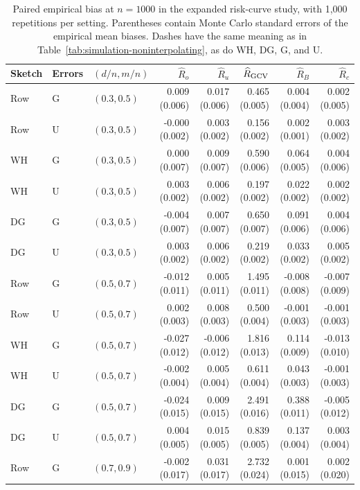 \documentclass{article}
\theoremstyle{plain}
\theoremstyle{definition}
\theoremstyle{definition}
\begin{document}
\begin{table}[!htbp]
    \centering
    \footnotesize
    \setlength{\tabcolsep}{2.5pt}
    \caption{Paired empirical bias at $n=1000$ in the expanded
    risk-curve study, with 1,000 repetitions per setting. Parentheses
    contain Monte Carlo standard errors of the empirical mean biases. Dashes have the same meaning as in
    Table~\ref{tab:simulation-noninterpolating}, as do WH, DG, G, and U.}
    \label{tab:appendix-accuracy-bias}
\begin{tabular}{@{}lllrrrrr@{}}
\toprule
Sketch & Errors & $(d/n,m/n)$ & $\widehat R_o$ & $\widehat R_u$ & $\widehat R_{\rm GCV}$ & $\widehat R_B$ & $\widehat R_c$ \\
\midrule
Row & G & $(0.3,0.5)$ & 0.009 (0.006) & 0.017 (0.006) & 0.465 (0.005) & 0.004 (0.004) & 0.002 (0.005) \\
Row & U & $(0.3,0.5)$ & -0.000 (0.002) & 0.003 (0.002) & 0.156 (0.002) & 0.002 (0.001) & 0.003 (0.002) \\
WH & G & $(0.3,0.5)$ & 0.000 (0.007) & 0.009 (0.007) & 0.590 (0.006) & 0.064 (0.005) & 0.004 (0.006) \\
WH & U & $(0.3,0.5)$ & 0.003 (0.002) & 0.006 (0.002) & 0.197 (0.002) & 0.022 (0.002) & 0.002 (0.002) \\
DG & G & $(0.3,0.5)$ & -0.004 (0.007) & 0.007 (0.007) & 0.650 (0.007) & 0.091 (0.006) & 0.004 (0.006) \\
DG & U & $(0.3,0.5)$ & 0.003 (0.002) & 0.006 (0.002) & 0.219 (0.002) & 0.033 (0.002) & 0.005 (0.002) \\
\midrule
Row & G & $(0.5,0.7)$ & -0.012 (0.011) & 0.005 (0.011) & 1.495 (0.011) & -0.008 (0.008) & -0.007 (0.009) \\
Row & U & $(0.5,0.7)$ & 0.002 (0.003) & 0.008 (0.003) & 0.500 (0.004) & -0.001 (0.003) & -0.001 (0.003) \\
WH & G & $(0.5,0.7)$ & -0.027 (0.012) & -0.006 (0.012) & 1.816 (0.013) & 0.114 (0.009) & -0.013 (0.010) \\
WH & U & $(0.5,0.7)$ & -0.002 (0.004) & 0.005 (0.004) & 0.611 (0.004) & 0.043 (0.003) & -0.001 (0.003) \\
DG & G & $(0.5,0.7)$ & -0.024 (0.015) & 0.009 (0.015) & 2.491 (0.016) & 0.388 (0.011) & -0.005 (0.012) \\
DG & U & $(0.5,0.7)$ & 0.004 (0.005) & 0.015 (0.005) & 0.839 (0.005) & 0.137 (0.004) & 0.003 (0.004) \\
\midrule
Row & G & $(0.7,0.9)$ & -0.002 (0.017) & 0.031 (0.017) & 2.732 (0.024) & 0.001 (0.015) & 0.002 (0.020) \\

\end{tabular}
\end{table}
\end{document}
